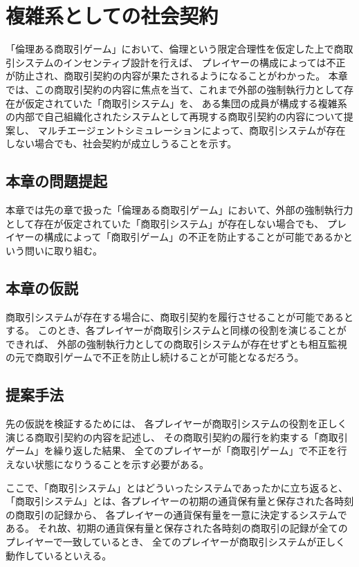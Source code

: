 \chapter{複雑系としての社会契約}
「倫理ある商取引ゲーム」において、倫理という限定合理性を仮定した上で商取引システムのインセンティブ設計を行えば、
プレイヤーの構成によっては不正が防止され、商取引契約の内容が果たされるようになることがわかった。
本章では、この商取引契約の内容に焦点を当て、これまで外部の強制執行力として存在が仮定されていた「商取引システム」を、
ある集団の成員が構成する複雑系の内部で自己組織化されたシステムとして再現する商取引契約の内容について提案し、
マルチエージェントシミュレーションによって、商取引システムが存在しない場合でも、社会契約が成立しうることを示す。

\section{本章の問題提起}
本章では先の章で扱った「倫理ある商取引ゲーム」において、外部の強制執行力として存在が仮定されていた「商取引システム」が存在しない場合でも、
プレイヤーの構成によって「商取引ゲーム」の不正を防止することが可能であるかという問いに取り組む。

\section{本章の仮説}
商取引システムが存在する場合に、商取引契約を履行させることが可能であるとする。
このとき、各プレイヤーが商取引システムと同様の役割を演じることができれば、
外部の強制執行力としての商取引システムが存在せずとも相互監視の元で商取引ゲームで不正を防止し続けることが可能となるだろう。

\section{提案手法}
先の仮説を検証するためには、
各プレイヤーが商取引システムの役割を正しく演じる商取引契約の内容を記述し、
その商取引契約の履行を約束する「商取引ゲーム」を繰り返した結果、
全てのプレイヤーが「商取引ゲーム」で不正を行えない状態になりうることを示す必要がある。

ここで、「商取引システム」とはどういったシステムであったかに立ち返ると、
「商取引システム」とは、各プレイヤーの初期の通貨保有量と保存された各時刻の商取引の記録から、
各プレイヤーの通貨保有量を一意に決定するシステムである。
それ故、初期の通貨保有量と保存された各時刻の商取引の記録が全てのプレイヤーで一致しているとき、
全てのプレイヤーが商取引システムが正しく動作しているといえる。

